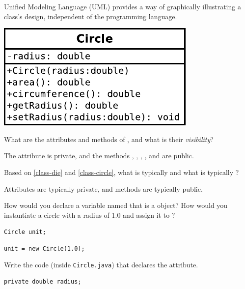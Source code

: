 \label{class-circle}

Unified Modeling Language (UML) provides a way of graphically illustrating a class’s design, independent of the programming language.

\begin{center}
\includegraphics{Circle.pdf}
\end{center}




\Q What are the attributes and methods of , and what is their \emph{visibility}?

\begin{answer}
The attribute  is private, and the methods , , , , and  are public.
\end{answer}


\Q Based on \ref{class-die} and \ref{class-circle}, what is typically  and what is typically ?

\begin{answer}
Attributes are typically private, and methods are typically public.
\end{answer}


\Q How would you declare a variable named  that is a  object?
How would you instantiate a circle with a radius of 1.0 and assign it to ?

\begin{answer}
\tt Circle unit;

\tt unit = new Circle(1.0);
\end{answer}


\Q Write the code (inside {\tt Circle.java}) that declares the  attribute.

\begin{answer}
\tt private double radius;
\end{answer}


